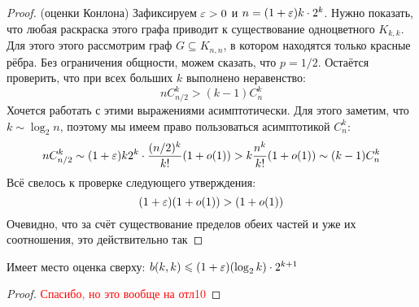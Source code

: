\begin{proof} (оценки Конлона)
	Зафиксируем $\varepsilon > 0$ и $n = (1 + \varepsilon)k \cdot 2^k$. Нужно показать, что любая раскраска этого графа приводит к существование одноцветного $K_{k, k}$. Для этого этого рассмотрим граф $G \subseteq K_{n, n}$, в котором находятся только красные рёбра. Без ограничения общности, можем сказать, что $p = 1 / 2$. Остаётся проверить, что при всех больших $k$ выполнено неравенство:
	\[
		nC_{n / 2}^k > (k - 1)C_n^k
	\]
	Хочется работать с этими выражениями асимптотически. Для этого заметим, что $k \sim \log_2 n$, поэтому мы имеем право пользоваться асимптотикой $C_n^k$:
	\[
		nC_{n / 2}^k \sim (1 + \varepsilon)k2^k \cdot \frac{(n / 2)^k}{k!}(1 + o(1)) > k \frac{n^k}{k!}(1 + o(1)) \sim (k - 1)C_n^k
	\]
	Всё свелось к проверке следующего утверждения:
	\[
		(1 + \varepsilon)(1 + o(1)) > (1 + o(1))
	\]
	Очевидно, что за счёт существование пределов обеих частей и уже их соотношения, это действительно так
\end{proof}

\begin{theorem}
	Имеет место оценка сверху: \(b(k, k) \leqslant (1 + \varepsilon)(\log_2 k) \cdot 2^{k + 1}\)
\end{theorem}

\begin{proof}
	\textcolor{red}{Спасибо, но это вообще на отл10}
\end{proof}

